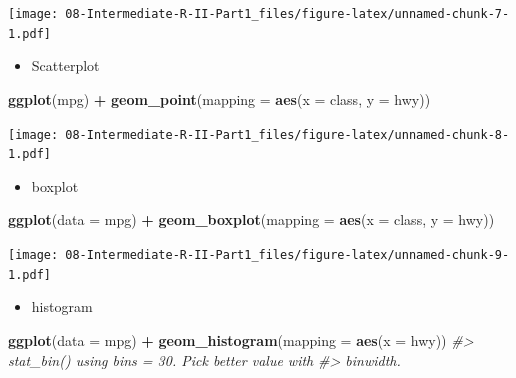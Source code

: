 \documentclass[
]{book}
\newenvironment{Shaded}{\begin{snugshade}}{\end{snugshade}}
\newcommand{\AttributeTok}[1]{\textcolor[rgb]{0.13,0.29,0.53}{#1}}
\newcommand{\CommentTok}[1]{\textcolor[rgb]{0.56,0.35,0.01}{\textit{#1}}}
\newcommand{\FunctionTok}[1]{\textcolor[rgb]{0.13,0.29,0.53}{\textbf{#1}}}
\newcommand{\NormalTok}[1]{#1}
\newcommand{\SpecialCharTok}[1]{\textcolor[rgb]{0.81,0.36,0.00}{\textbf{#1}}}
\providecommand{\tightlist}{%
  \setlength{\itemsep}{0pt}\setlength{\parskip}{0pt}}
\begin{document}
\texttt{[image: 08-Intermediate-R-II-Part1\_files/figure-latex/unnamed-chunk-7-1.pdf]}

\begin{itemize}
\tightlist
\item
  Scatterplot
\end{itemize}

\begin{Shaded}
\begin{Highlighting}[]
\FunctionTok{ggplot}\NormalTok{(mpg) }\SpecialCharTok{+} 
  \FunctionTok{geom\_point}\NormalTok{(}\AttributeTok{mapping =} \FunctionTok{aes}\NormalTok{(}\AttributeTok{x =}\NormalTok{ class, }\AttributeTok{y =}\NormalTok{ hwy))}
\end{Highlighting}
\end{Shaded}

\texttt{[image: 08-Intermediate-R-II-Part1\_files/figure-latex/unnamed-chunk-8-1.pdf]}

\begin{itemize}
\tightlist
\item
  boxplot
\end{itemize}

\begin{Shaded}
\begin{Highlighting}[]
\FunctionTok{ggplot}\NormalTok{(}\AttributeTok{data =}\NormalTok{ mpg) }\SpecialCharTok{+}
  \FunctionTok{geom\_boxplot}\NormalTok{(}\AttributeTok{mapping =} \FunctionTok{aes}\NormalTok{(}\AttributeTok{x =}\NormalTok{ class, }\AttributeTok{y =}\NormalTok{ hwy))}
\end{Highlighting}
\end{Shaded}

\texttt{[image: 08-Intermediate-R-II-Part1\_files/figure-latex/unnamed-chunk-9-1.pdf]}

\begin{itemize}
\tightlist
\item
  histogram
\end{itemize}

\begin{Shaded}
\begin{Highlighting}[]
\FunctionTok{ggplot}\NormalTok{(}\AttributeTok{data =}\NormalTok{ mpg) }\SpecialCharTok{+}
  \FunctionTok{geom\_histogram}\NormalTok{(}\AttributeTok{mapping =} \FunctionTok{aes}\NormalTok{(}\AttributeTok{x =}\NormalTok{ hwy))}
\CommentTok{\#\textgreater{} \textasciigrave{}stat\_bin()\textasciigrave{} using \textasciigrave{}bins = 30\textasciigrave{}. Pick better value with}
\CommentTok{\#\textgreater{} \textasciigrave{}binwidth\textasciigrave{}.}
\end{Highlighting}
\end{Shaded}
\end{document}
